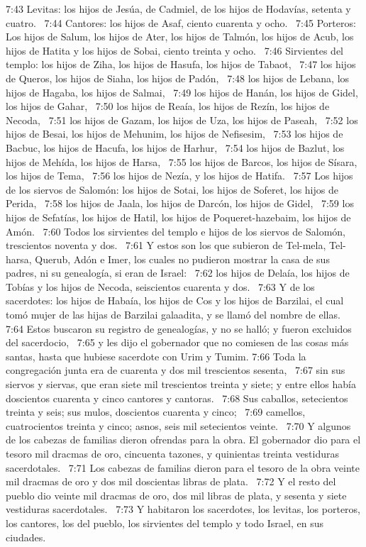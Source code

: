 7:43 Levitas: los hijos de Jesúa, de Cadmiel, de los hijos de Hodavías, setenta y cuatro.  
7:44 Cantores: los hijos de Asaf, ciento cuarenta y ocho.  
7:45 Porteros: Los hijos de Salum, los hijos de Ater, los hijos de Talmón, los hijos de Acub, los hijos de Hatita y los hijos de Sobai, ciento treinta y ocho.  
7:46 Sirvientes del templo: los hijos de Ziha, los hijos de Hasufa, los hijos de Tabaot,  
7:47 los hijos de Queros, los hijos de Siaha, los hijos de Padón,  
7:48 los hijos de Lebana, los hijos de Hagaba, los hijos de Salmai,  
7:49 los hijos de Hanán, los hijos de Gidel, los hijos de Gahar,  
7:50 los hijos de Reaía, los hijos de Rezín, los hijos de Necoda,  
7:51 los hijos de Gazam, los hijos de Uza, los hijos de Paseah,  
7:52 los hijos de Besai, los hijos de Mehunim, los hijos de Nefisesim,  
7:53 los hijos de Bacbuc, los hijos de Hacufa, los hijos de Harhur,  
7:54 los hijos de Bazlut, los hijos de Mehída, los hijos de Harsa,  
7:55 los hijos de Barcos, los hijos de Sísara, los hijos de Tema,  
7:56 los hijos de Nezía, y los hijos de Hatifa.  
7:57 Los hijos de los siervos de Salomón: los hijos de Sotai, los hijos de Soferet, los hijos de Perida,  
7:58 los hijos de Jaala, los hijos de Darcón, los hijos de Gidel,  
7:59 los hijos de Sefatías, los hijos de Hatil, los hijos de Poqueret-hazebaim, los hijos de Amón.  
7:60 Todos los sirvientes del templo e hijos de los siervos de Salomón, trescientos noventa y dos.  
7:61 Y estos son los que subieron de Tel-mela, Tel-harsa, Querub, Adón e Imer, los cuales no pudieron mostrar la casa de sus padres, ni su genealogía, si eran de Israel:  
7:62 los hijos de Delaía, los hijos de Tobías y los hijos de Necoda, seiscientos cuarenta y dos.  
7:63 Y de los sacerdotes: los hijos de Habaía, los hijos de Cos y los hijos de Barzilai, el cual tomó mujer de las hijas de Barzilai galaadita, y se llamó del nombre de ellas.  
7:64 Estos buscaron su registro de genealogías, y no se halló; y fueron excluidos del sacerdocio,  
7:65 y les dijo el gobernador que no comiesen de las cosas más santas, hasta que hubiese sacerdote con Urim y Tumim. 
7:66 Toda la congregación junta era de cuarenta y dos mil trescientos sesenta,  
7:67 sin sus siervos y siervas, que eran siete mil trescientos treinta y siete; y entre ellos había doscientos cuarenta y cinco cantores y cantoras.  
7:68 Sus caballos, setecientos treinta y seis; sus mulos, doscientos cuarenta y cinco;  
7:69 camellos, cuatrocientos treinta y cinco; asnos, seis mil setecientos veinte.  
7:70 Y algunos de los cabezas de familias dieron ofrendas para la obra. El gobernador dio para el tesoro mil dracmas de oro, cincuenta tazones, y quinientas treinta vestiduras sacerdotales.  
7:71 Los cabezas de familias dieron para el tesoro de la obra veinte mil dracmas de oro y dos mil doscientas libras de plata.  
7:72 Y el resto del pueblo dio veinte mil dracmas de oro, dos mil libras de plata, y sesenta y siete vestiduras sacerdotales.  
7:73 Y habitaron los sacerdotes, los levitas, los porteros, los cantores, los del pueblo, los sirvientes del templo y todo Israel, en sus ciudades. 
